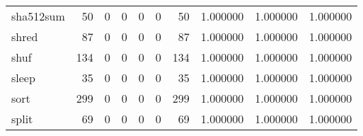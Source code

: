 \begin{longtable}{lrrrrrrrrr}
sha512sum &                                        50 &                                                  0 &                                                  0 &                                                  0 &                                                  0 &                                                 50 &                                           1.000000 &                               1.000000 &                             1.000000 \\
shred     &                                        87 &                                                  0 &                                                  0 &                                                  0 &                                                  0 &                                                 87 &                                           1.000000 &                               1.000000 &                             1.000000 \\
shuf      &                                       134 &                                                  0 &                                                  0 &                                                  0 &                                                  0 &                                                134 &                                           1.000000 &                               1.000000 &                             1.000000 \\
sleep     &                                        35 &                                                  0 &                                                  0 &                                                  0 &                                                  0 &                                                 35 &                                           1.000000 &                               1.000000 &                             1.000000 \\
sort      &                                       299 &                                                  0 &                                                  0 &                                                  0 &                                                  0 &                                                299 &                                           1.000000 &                               1.000000 &                             1.000000 \\
split     &                                        69 &                                                  0 &                                                  0 &                                                  0 &                                                  0 &                                                 69 &                                           1.000000 &                               1.000000 &                             1.000000 \\

\end{longtable}
